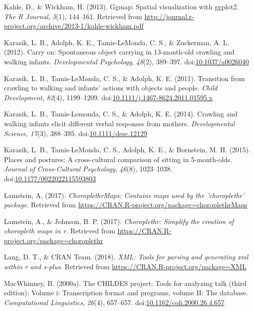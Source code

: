 \documentclass[english,man]{apa6}
\theoremstyle{definition}
\theoremstyle{definition}
\theoremstyle{definition}
\theoremstyle{remark}
\begin{document}
\hypertarget{ref-R-ggmap}{}
Kahle, D., \& Wickham, H. (2013). Ggmap: Spatial visualization with
ggplot2. \emph{The R Journal}, \emph{5}(1), 144--161. Retrieved from
\url{http://journal.r-project.org/archive/2013-1/kahle-wickham.pdf}

\hypertarget{ref-Karasik2012-jq}{}
Karasik, L. B., Adolph, K. E., Tamis-LeMonda, C. S., \& Zuckerman, A. L.
(2012). Carry on: Spontaneous object carrying in 13-month-old crawling
and walking infants. \emph{Developmental Psychology}, \emph{48}(2),
389--397. doi:\href{https://doi.org/10.1037/a0026040}{10.1037/a0026040}

\hypertarget{ref-Karasik2011-mf}{}
Karasik, L. B., Tamis-LeMonda, C. S., \& Adolph, K. E. (2011).
Transition from crawling to walking and infants' actions with objects
and people. \emph{Child Development}, \emph{82}(4), 1199--1209.
doi:\href{https://doi.org/10.1111/j.1467-8624.2011.01595.x}{10.1111/j.1467-8624.2011.01595.x}

\hypertarget{ref-Karasik2014-cd}{}
Karasik, L. B., Tamis-Lemonda, C. S., \& Adolph, K. E. (2014). Crawling
and walking infants elicit different verbal responses from mothers.
\emph{Developmental Science}, \emph{17}(3), 388--395.
doi:\href{https://doi.org/10.1111/desc.12129}{10.1111/desc.12129}

\hypertarget{ref-Karasik2015-mi}{}
Karasik, L. B., Tamis-LeMonda, C. S., Adolph, K. E., \& Bornstein, M. H.
(2015). Places and postures: A cross-cultural comparison of sitting in
5-month-olds. \emph{Journal of Cross-Cultural Psychology}, \emph{46}(8),
1023--1038.
doi:\href{https://doi.org/10.1177/0022022115593803}{10.1177/0022022115593803}

\hypertarget{ref-R-choroplethrMaps}{}
Lamstein, A. (2017). \emph{ChoroplethrMaps: Contains maps used by the
'choroplethr' package}. Retrieved from
\url{https://CRAN.R-project.org/package=choroplethrMaps}

\hypertarget{ref-R-choroplethr}{}
Lamstein, A., \& Johnson, B. P. (2017). \emph{Choroplethr: Simplify the
creation of choropleth maps in r}. Retrieved from
\url{https://CRAN.R-project.org/package=choroplethr}

\hypertarget{ref-R-XML}{}
Lang, D. T., \& CRAN Team. (2018). \emph{XML: Tools for parsing and
generating xml within r and s-plus}. Retrieved from
\url{https://CRAN.R-project.org/package=XML}

\hypertarget{ref-MacWhinney2000-yn}{}
MacWhinney, B. (2000a). The CHILDES project: Tools for analyzing talk
(third edition): Volume i: Transcription format and programs, volume II:
The database. \emph{Computational Linguistics}, \emph{26}(4), 657--657.
doi:\href{https://doi.org/10.1162/coli.2000.26.4.657}{10.1162/coli.2000.26.4.657}
\end{document}
